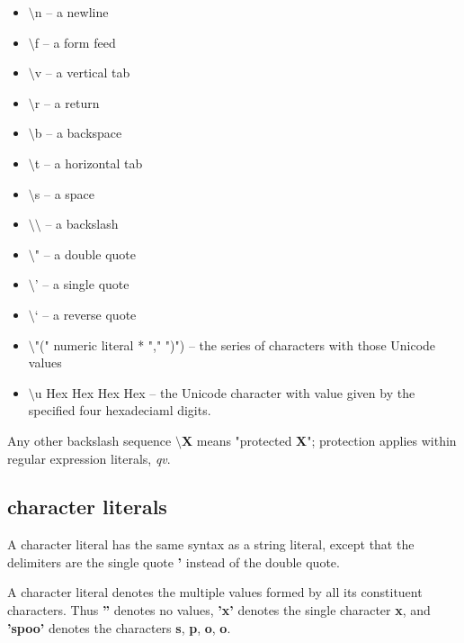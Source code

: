 \documentclass{report}
\begin{document}
\begin{itemize}\item $\setminus$n -- a newline

\item $\setminus$f -- a form feed

\item $\setminus$v -- a vertical tab

\item $\setminus$r -- a return

\item $\setminus$b -- a backspace

\item $\setminus$t -- a horizontal tab

\item $\setminus$s -- a space

\item $\setminus$$\setminus$ -- a backslash

\item $\setminus$" -- a double quote

\item $\setminus$' -- a single quote

\item $\setminus$` -- a reverse quote

\item $\setminus$"(" numeric literal * "," ")")
-- the series of characters with those
Unicode values

\item $\setminus$u Hex Hex Hex Hex -- the Unicode character with value given by the
specified four hexadeciaml digits.

\end{itemize}

Any other backslash sequence {\bf $\setminus$X} means "protected {\bf X}"; protection applies
within regular expression literals, {\em qv}.

\subsection{character literals}


A character literal has the same syntax as a string literal, except that the
delimiters are the single quote {\bf '} instead of the double quote.

A character literal denotes the multiple values formed by all its constituent
characters. Thus {\bf ''} denotes no values, {\bf 'x'} denotes the single character
{\bf x}, and {\bf 'spoo'} denotes the characters {\bf s}, {\bf p}, {\bf o}, {\bf o}.
\end{document}
